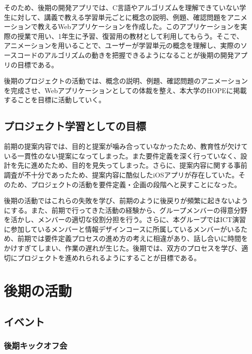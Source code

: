 \documentclass[openany,11pt,papersize]{jsbook}
\begin{document}
\par
そのため、後期の開発アプリでは、C言語やアルゴリズムを理解できていない学生に対して、講義で教える学習単元ごとに概念の説明、例題、確認問題をアニメーションで教えるWebアプリケーションを作成した。このアプリケーションを実際の授業で用い、1年生に予習、復習用の教材として利用してもらう。そこで、アニメーションを用いることで、ユーザーが学習単元の概念を理解し、実際のソースコードのアルゴリズムの動きを把握できるようになることが後期の開発アプリの目標である。
\par
後期のプロジェクトの活動では、概念の説明、例題、確認問題のアニメーションを完成させ、Webアプリケーションとしての体裁を整え、本大学のHOPEに掲載することを目標に活動していく。

\section{プロジェクト学習としての目標}
前期の提案内容では、目的と提案が噛み合っていなかったため、教育性が欠けている一貫性のない提案になってしまった。また要件定義を深く行っていなく、設計を先に進めたため、目的を見失ってしまった。さらに、提案内容に関する事前調査が不十分であったため、提案内容に酷似したiOSアプリが存在していた。そのため、プロジェクトの活動を要件定義・企画の段階へと戻すことになった。
\par
後期の活動ではこれらの失敗を学び、前期のように後戻りが頻繁に起きないようにする。また、前期で行ってきた活動の経験から、グループメンバーの得意分野を活かし、メンバーの適切な役割分担を行う。さらに、本グループではICT演習に参加しているメンバーと情報デザインコースに所属しているメンバーがいるため、前期では要件定義プロセスの進め方の考えに相違があり、話し合いに時間をかけすぎてしまい、作業の遅れが生じた。後期では、双方のプロセスを学び、適切にプロジェクトを進めれられるようにすることが目標である。



\chapter{後期の活動}


\section{イベント}

\subsection{後期キックオフ会}
\end{document}
